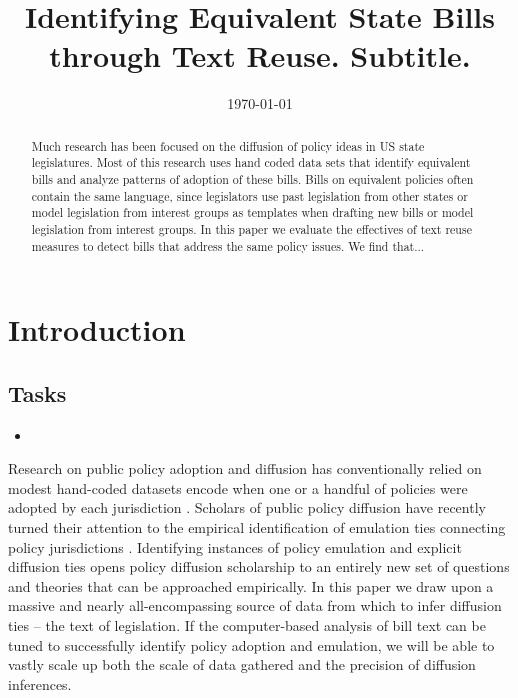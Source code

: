 \documentclass[12pt]{article} %
\begin{document}
 

\title{Identifying Equivalent State Bills through Text Reuse. \large Subtitle.}
\date{\today}
\author{}

\maketitle

\begin{abstract}
Much research has been focused on the diffusion of policy ideas in US state
legislatures. Most of this research uses hand coded data sets that identify
equivalent bills and analyze patterns of adoption of these bills. Bills on
equivalent policies often contain the same language, since legislators use past
legislation from other states or model legislation from interest groups as
templates when drafting new bills or model legislation from interest groups. In
this paper we evaluate the effectives of text reuse measures to detect bills
that address the same policy issues. We find that... 
\end{abstract}

\section{Introduction}

\subsection{Tasks}
\begin{itemize}
\item
\end{itemize}

Research on public policy adoption and diffusion has conventionally relied on modest hand-coded datasets encode when one or a handful of policies were adopted by each jurisdiction \citep{boehmke2012}. Scholars of public policy diffusion have recently turned their attention to the empirical identification of emulation ties connecting policy jurisdictions \citep{volden2006,boehmke2009,desmarais2015,garrett2015}. Identifying instances of policy emulation and explicit diffusion ties opens policy diffusion scholarship to an entirely new set of questions and theories that can be approached empirically. In this paper we draw upon a massive and nearly all-encompassing source of data from which to infer diffusion ties -- the text of legislation. If the computer-based analysis of bill text can be tuned to successfully identify policy adoption and emulation, we will be able to vastly scale up both the scale of data gathered and the precision of diffusion inferences.
\end{document}
